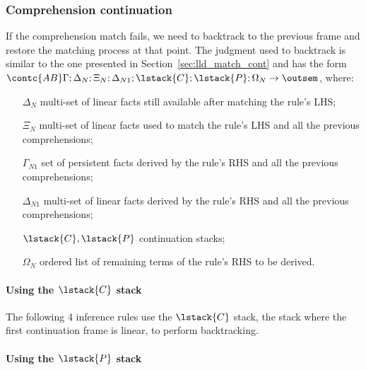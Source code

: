 

\subsubsection{Comprehension continuation}

If the comprehension match fails, we need to backtrack to the previous frame and
restore the matching process at that point. The judgment used to backtrack is
similar to the one presented in Section~\ref{sec:lld_match_cont} and has the
form $\contc{AB} \Gamma; \Delta_N; \Xi_N; \Delta_{N1}; \lstack{C}; \lstack{P}; \Omega_N
\rightarrow \outsem$, where:

\begin{enumerate}

   \item[$\Delta_N$] multi-set of linear facts still available after matching
      the rule's LHS;

   \item[$\Xi_N$] multi-set of linear facts used to match the rule's LHS and all
      the previous comprehensions;

   \item[$\Gamma_{N1}$] set of persistent facts derived by the rule's RHS and
      all the previous comprehensions;

   \item[$\Delta_{N1}$] multi-set of linear facts derived by the rule's RHS and
      all the previous comprehensions;

   \item[$\lstack{C}, \lstack{P}$] continuation stacks;

   \item[$\Omega_N$] ordered list of remaining terms of the rule's RHS to be
      derived.

\end{enumerate}

\paragraph{Using the $\lstack{C}$ stack}

The following 4 inference rules use the $\lstack{C}$ stack, the stack where the
first continuation frame is linear, to perform backtracking.



\paragraph{Using the $\lstack{P}$ stack}

